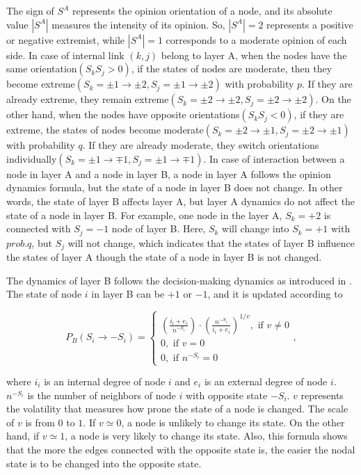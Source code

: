 The sign of $S^A$ represents the opinion orientation of a node, and its absolute value $|S^A|$ measures the intensity of its opinion. So, $|S^A|=2$ represents a positive or negative extremist, while  $|S^A|=1$ corresponds to a moderate opinion of each side. In case of internal link $(k, j)$ belong to layer A, when the nodes have the same orientation$(S_kS_j>0)$, if the states of nodes are moderate, then they become extreme$(S_k=\pm1 \rightarrow \pm2, S_j= \pm1 \rightarrow \pm2)$ with probability $p$. If they are already extreme, they remain extreme$(S_k=\pm2 \rightarrow \pm2, S_j= \pm2 \rightarrow \pm2)$. On the other hand, when the nodes have opposite orientations$(S_kS_j<0)$, if they are extreme, the states of nodes become moderate$(S_k=\pm2 \rightarrow \pm1, S_j= \pm2 \rightarrow \pm1)$ with probability $q$. If they are already moderate, they switch orientations individually$(S_k=\pm1 \rightarrow \mp1, S_j= \pm1 \rightarrow \mp1)$.  In case of interaction between a node in layer A and a node in layer B, a node in layer A follows the opinion dynamics formula, but the state of a node in layer B does not change. In other words, the state of layer B affects layer A, but layer A dynamics do not affect the state of a node in layer B. For example, one node in the layer A, $S_k = +2$ is connected with  $S_j = -1$ node of layer B. Here, $S_k$ will change into $S_k = +1$ with $prob.q$, but $S_j$ will not change, which indicates that the states of layer B influence the states of layer A though the state of a node in layer B is not changed. 

The dynamics of layer B follows the decision-making dynamics as introduced in \parencite{abrams2003, vazquez2010}. The state of node $i$ in layer B can be $+1$ or $-1$, and it is updated according to

\begin{equation}
{P_B}({S_i} \to  - {S_i}) = \begin{cases}
{\left({\displaystyle\frac{{{i_i} + {e_i}}}{{{n^{ - {S_i}}}}}}\right)}{\cdot}{\left({\displaystyle\frac{{n^{-{S_i}}}}{{{i_i} + {e_i}}}} \right)^{1/v}}  ,\mbox{ if } v \ne 0\\
0,\mbox{ if } v = 0\\
0,\mbox{ if } {n^{ - {S_i}}} = 0
\end{cases},
\end{equation}

where $i_i$ is an internal degree of node $i$ and $e_i$ is an external degree of node $i$. $n^{-S_i}$ is the number of neighbors of node $i$ with opposite state $-S_i$. $v$ represents the volatility that measures how prone the state of a node is changed. The scale of $v$ is from $0$ to $1$. If $v \simeq 0$,  a node is unlikely to change its state. On the other hand, if $v \simeq 1$, a node is very likely to change its state. Also, this formula shows that the more the edges connected with the opposite state is, the easier the nodal state is to be changed into the opposite state.

